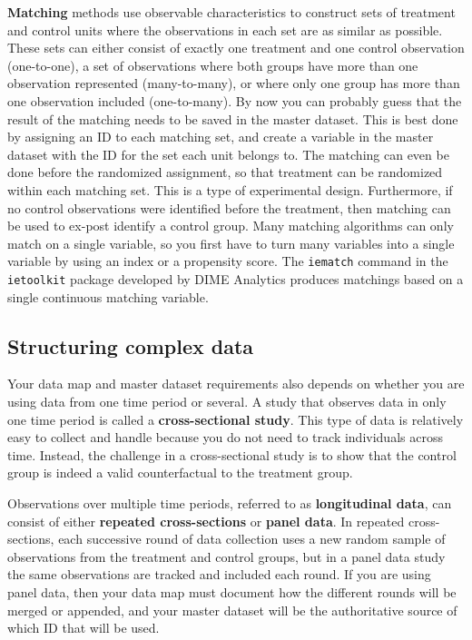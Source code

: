 \textbf{Matching}
methods use observable characteristics to construct
sets of treatment and control units
where the observations in each set 
are as similar as possible. 
These sets can either consist of exactly one treatment and one control observation (one-to-one),
a set of observations where
both groups have more than one observation represented (many-to-many),
or where only one group has more than one observation included (one-to-many).
By now you can probably guess that 
the result of the matching needs to be saved in the master dataset.
This is best done by assigning an ID to each matching set, 
and create a variable in the master dataset 
with the ID for the set each unit belongs to.
The matching can even be done before the randomized assignment,
so that treatment can be randomized within each matching set.
This is a type of experimental design.
Furthermore, if no control observations were identified before the treatment,
then matching can be used to ex-post identify a control group.
Many matching algorithms can only match on a single variable,
so you first have to turn many variables into a single variable
by using an index or a propensity score.
The \texttt{iematch}
command in the \texttt{ietoolkit} package developed by DIME Analytics
produces matchings based on a single continuous matching variable.

\subsection{Structuring complex data}

Your data map and master dataset requirements also depends on
whether you are using data from one time period or several.
A study that observes data in only one time period is called
a \textbf{cross-sectional study}.
This type of data is relatively easy to collect and handle because
you do not need to track individuals across time.
Instead, the challenge in a cross-sectional study is to
show that the control group is indeed a valid counterfactual to the treatment group.

Observations over multiple time periods, 
referred to as \textbf{longitudinal data},
can consist of either \textbf{repeated cross-sections}
or \textbf{panel data}.
In repeated cross-sections,
each successive round of data collection uses a new random sample
of observations from the treatment and control groups,
but in a panel data study the same observations are tracked and included each round.
If you are using panel data,
then your data map must document how the different rounds will be merged or appended,
and your master dataset will be the authoritative source of which ID that will be used. 

